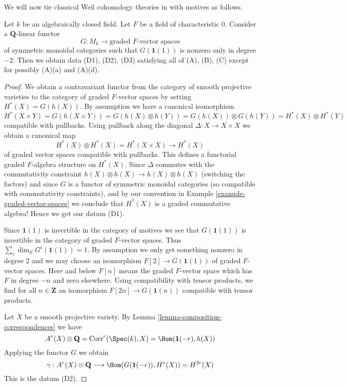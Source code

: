 \noindent
We will now tie classical Weil cohomology theories in with motives as follows.

\begin{lemma}
\label{lemma-from-functor-to-weil-classical}
Let $k$ be an algebraically closed field. Let $F$ be a field of
characteristic $0$. Consider a $\mathbf{Q}$-linear functor
$$
G : M_k \longrightarrow \text{graded }F\text{-vector spaces}
$$
of symmetric monoidal categories such that $G(\mathbf{1}(1))$
is nonzero only in degree $-2$. Then we obtain data (D1), (D2), (D3)
satisfying all of (A), (B), (C) except for possibly (A)(a) and (A)(d).
\end{lemma}

\begin{proof}
We obtain a contravariant functor from the category of smooth
projective varieties to the category of graded $F$-vector spaces
by setting $H^*(X) = G(h(X))$. By assumption we have a canonical
isomorphism
$$
H^*(X \times Y) = G(h(X \times Y)) = G(h(X) \otimes h(Y)) =
G(h(X)) \otimes G(h(Y)) = H^*(X) \otimes H^*(Y)
$$
compatible with pullbacks. Using pullback along the diagonal
$\Delta : X \to X \times X$ we obtain a canonical map
$$
H^*(X) \otimes H^*(X) = H^*(X \times X) \to H^*(X)
$$
of graded vector spaces compatible with pullbacks.
This defines a functorial graded $F$-algebra structure on
$H^*(X)$. Since $\Delta$ commutes with the commutativity
constraint $h(X) \otimes h(X) \to h(X) \otimes h(X)$ (switching the factors)
and since $G$ is a functor of symmetric monoidal categories (so compatible with
commutativity constraints), and by our convention in
Example \ref{example-graded-vector-spaces}
we conclude that $H^*(X)$ is a graded
commutative algebra! Hence we get our datum (D1).

\medskip\noindent
Since $\mathbf{1}(1)$ is invertible in the category of motives
we see that $G(\mathbf{1}(1))$ is invertible in the category of
graded $F$-vector spaces. Thus$\sum_i \dim_F G^i(\mathbf{1}(1)) = 1$.
By assumption we only get something nonzero in degree $2$ and we may
choose an isomorphism $F[2] \to G(\mathbf{1}(1))$ of graded $F$-vector spaces.
Here and below $F[n]$ means the graded $F$-vector space which has
$F$ in degree $-n$ and zero elsewhere. Using compatibility with
tensor products, we find for all $n \in \mathbf{Z}$ an isomorphism
$F[2n] \to G(\mathbf{1}(n))$ compatible with tensor products.

\medskip\noindent
Let $X$ be a smooth projective variety. By
Lemma \ref{lemma-composition-correspondences} we have
$$
A^r(X) \otimes \mathbf{Q} = \text{Corr}^r(\Spec(k), X) =
\Hom(\mathbf{1}(-r), h(X))
$$
Applying the functor $G$ we obtain
$$
\gamma :
A^r(X) \otimes \mathbf{Q} \longrightarrow
\Hom(G(\mathbf{1}(-r)), H^*(X)) = H^{2r}(X)
$$
This is the datum (D2).


\end{proof}
